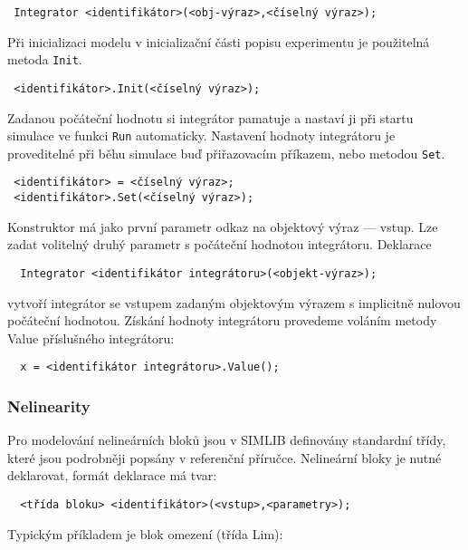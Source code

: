 \documentclass[a4paper]{article}
\begin{document}
\begin{verbatim}
 Integrator <identifikátor>(<obj-výraz>,<číselný výraz>);
\end{verbatim}

Při inicializaci modelu v inicializační části popisu experimentu
je použitelná metoda \verb|Init|.

\begin{verbatim}
 <identifikátor>.Init(<číselný výraz>);
\end{verbatim}

Zadanou počáteční hodnotu si integrátor pamatuje a nastaví ji
při startu simulace ve funkci \verb|Run| automaticky. Nastavení hodnoty
integrátoru je proveditelné při běhu simulace buď přiřazovacím
příkazem, nebo metodou \verb|Set|.

\begin{verbatim}
 <identifikátor> = <číselný výraz>;
 <identifikátor>.Set(<číselný výraz>);
\end{verbatim}

Konstruktor má jako první parametr odkaz na objektový výraz
--- vstup. Lze zadat volitelný druhý parametr s počáteční hodnotou
integrátoru. Deklarace

\begin{verbatim}
  Integrator <identifikátor integrátoru>(<objekt-výraz>);
\end{verbatim}

vytvoří integrátor se vstupem zadaným objektovým výrazem
s implicitně nulovou počáteční hodnotou. Získání hodnoty
integrátoru provedeme voláním metody Value příslušného
integrátoru:

\begin{verbatim}
  x = <identifikátor integrátoru>.Value();
\end{verbatim}


\subsubsection{Nelinearity}

Pro modelování nelineárních bloků jsou v SIMLIB definovány
standardní třídy, které jsou podrobněji popsány v referenční
příručce. Nelineární bloky je nutné deklarovat, formát deklarace
má tvar:

\begin{verbatim}
  <třída bloku> <identifikátor>(<vstup>,<parametry>);
\end{verbatim}

Typickým příkladem je blok omezení (třída  Lim):
\end{document}

